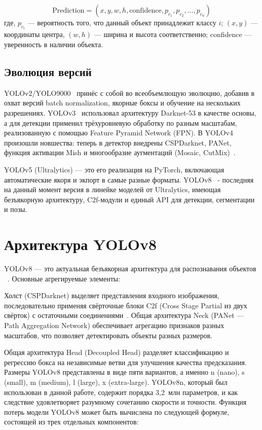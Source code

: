 \begin{equation}
\text{Prediction} = (x, y, w, h, \text{confidence}, p_{c_1}, p_{c_2}, \ldots, p_{c_n})
\label{eq:yolo}
\end{equation}
\noindent где, $p_{c_i}$ --- вероятность того, что данный объект принадлежит классу $i$;
$(x,y)$ --- координаты центра, $(w,h)$ --- ширина и высота соответственно;
confidence --- уверенность в наличии объекта. \subsection{Эволюция версий}

YOLOv2/YOLO9000~\cite{redmon2017yolo9000} принёс с собой во всеобъемлющую эволюцию, добавив в охват версий batch normalization, якорные боксы и обучение на нескольких разрешениях. YOLOv3~\cite{redmon2018yolov3} использовал архитектуру Darknet-53 в качестве основы, а для детекции применил трёхуровневую обработку по разным масштабам, реализованную с помощью Feature Pyramid Network (FPN).
В YOLOv4~\cite{bochkovskiy2020yolov4} произошли новшества: теперь в детектор внедрены CSPDarknet, PANet, функция активации Mish и многообразие аугментаций (Mosaic, CutMix)~\cite{shorten2019augmentation}.

YOLOv5 (Ultralytics) --- это его реализация на PyTorch, включающая автоматические якоря и экпорт в самые разные форматы. YOLOv8~\cite{ultralytics2023yolov8} - последняя на данный момент версия в линейке моделей от Ultralytics, имеющая безъякорную архитектуру, C2f-модули и единый API для детекции, сегментации и позы. \section{Архитектура YOLOv8}

YOLOv8 --- это актуальная безъякорная архитектура для распознавания объектов ~\cite{ultralytics2023yolov8}. Основные агрегируемые элементы:

Холст (CSPDarknet) выделяет представления входного изображения, последовательно применяя свёрточные блоки C2f (Cross Stage Partial из двух свёрток) с остаточными соединениями~\cite{he2016resnet}. Общая архитектура Neck (PANet --- Path Aggregation Network) обеспечивает агрегацию признаков разных масштабов, что позволяет детектировать объекты разных размеров.

Общая архитектура Head (Decoupled Head) разделяет классификацию и регрессию бокса на независимые ветви для улучшения качества предсказания. Размеры YOLOv8 представлены в виде пяти вариантов, а именно n (nano), s (small), m (medium), l (large), x (extra-large). YOLOv8n, который был использован в данной работе, содержит порядка 3{,}2~млн параметров, и как следствие удовлетворяет разумному сочетанию скорости и точности. Функция потерь модели YOLOv8 может быть вычислена по следующей формуле, состоящей из трех отдельных компонентов:

